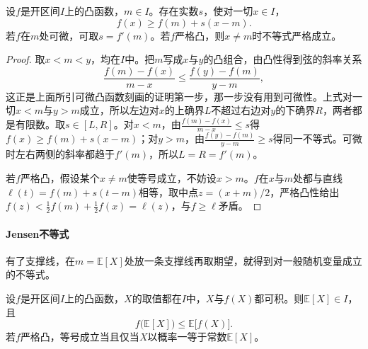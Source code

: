 \begin{lemma}[凸函数的支撑线]
\label{lem:rvm-support-line}
设$f$是开区间$I$上的凸函数，$m\in I$。存在实数$s$，使对一切$x\in I$，
\begin{equation}
 f(x)\geq f(m)+s(x-m) .
 \label{eq:rvm-support-line}
\end{equation}
若$f$在$m$处可微，可取$s=f'(m)$。若$f$严格凸，则$x\neq m$时不等式严格成立。
\end{lemma}

\begin{proof}
取$x<m<y$，均在$I$中。把$m$写成$x$与$y$的凸组合，由凸性得到弦的斜率关系
\[
 \frac{f(m)-f(x)}{m-x}\leq\frac{f(y)-f(m)}{y-m},
\]
这正是上面所引可微凸函数刻画的证明第一步，那一步没有用到可微性。上式对一切$x<m$与$y>m$成立，所以左边对$x$的上确界$L$不超过右边对$y$的下确界$R$，两者都是有限数。取$s\in[L,R]$。对$x<m$，由$\frac{f(m)-f(x)}{m-x}\leq s$得$f(x)\geq f(m)+s(x-m)$；对$y>m$，由$\frac{f(y)-f(m)}{y-m}\geq s$得同一不等式。可微时左右两侧的斜率都趋于$f'(m)$，所以$L=R=f'(m)$。

若$f$严格凸，假设某个$x\neq m$使等号成立，不妨设$x>m$。$f$在$x$与$m$处都与直线$\ell(t)=f(m)+s(t-m)$相等，取中点$z=(x+m)/2$，严格凸性给出$f(z)<\frac12f(m)+\frac12f(x)=\ell(z)$，与$f\geq\ell$矛盾。
\end{proof}

\paragraph{Jensen不等式}
有了支撑线，在$m=\mathbb{E}[X]$处放一条支撑线再取期望，就得到对一般随机变量成立的不等式。

\begin{theorem}[Jensen不等式]
\label{thm:rvm-jensen}
设$f$是开区间$I$上的凸函数，$X$的取值都在$I$中，$X$与$f(X)$都可积。则$\mathbb{E}[X]\in I$，且
\begin{equation}
 f\bigl(\mathbb{E}[X]\bigr)\leq\mathbb{E}\bigl[f(X)\bigr] .
 \label{eq:rvm-jensen}
\end{equation}
若$f$严格凸，等号成立当且仅当$X$以概率一等于常数$\mathbb{E}[X]$。
\end{theorem}

